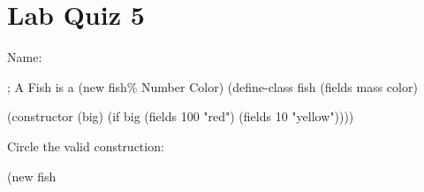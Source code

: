\documentclass{article}
\begin{document}
\section*{Lab Quiz 5}

\bigskip
\bigskip
Name: \underline{\hspace*{4in}}

\bigskip
\setlength{\parskip}{8pt}

\begin{schemedisplay}
  ; A Fish is a (new fish\% Number Color)
  (define-class fish%
    (fields mass color)

    (constructor (big)
      (if big
          (fields 100 "red")
          (fields 10 "yellow"))))
\end{schemedisplay}

\bigskip
Circle the valid construction:
\bigskip

\begin{schemedisplay}
        (new fish%
\end{schemedisplay}
\end{document}
